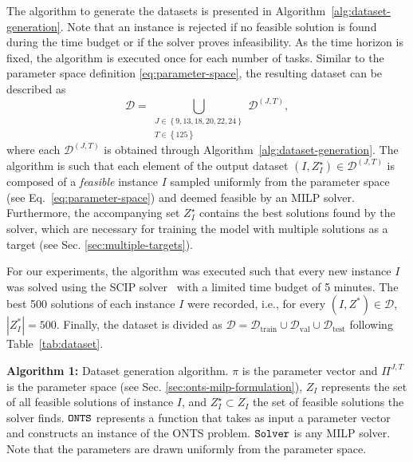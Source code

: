 The algorithm to generate the datasets is presented in Algorithm~\ref{alg:dataset-generation}.
Note that an instance is rejected if no feasible solution is found during the time budget or if the solver proves infeasibility.
As the time horizon is fixed, the algorithm is executed once for each number of tasks.
Similar to the parameter space definition \eqref{eq:parameter-space}, the resulting dataset can be described as
\begin{equation}\label{eq:dataset}
    \mathcal{D} = \bigcup_{\substack{J \in \left\{ 9,13,18,20,22,24 \right\} \\ T \in \left\{ 125 \right\} }}  \mathcal{D}^{(J,T)}
,\end{equation}
where each $\mathcal{D}^{(J,T)}$ is obtained through Algorithm~\ref{alg:dataset-generation}.
The algorithm is such that each element of the output dataset $(I,Z^\star_I) \in \mathcal{D}^{(J,T)}$ is composed of a \emph{feasible} instance $I$ sampled uniformly from the parameter space (see Eq.~\eqref{eq:parameter-space}) and deemed feasible by an MILP solver.
Furthermore, the accompanying set $Z^\star_I$ contains the best solutions found by the solver, which are necessary for training the model with multiple solutions as a target (see Sec. \ref{sec:multiple-targets}).

For our experiments, the algorithm was executed such that every new instance $I$ was solved using the SCIP solver~\cite{bestuzhevaSCIPOptimizationSuite2021} with a limited time budget of 5 minutes.
The best 500 solutions of each instance $I$ were recorded, i.e., for every $(I,Z^{*}) \in \mathcal{D}$, $|Z^{*}_I| = 500$.
Finally, the dataset is divided as $\mathcal{D} = \mathcal{D}_\textrm{train} \cup \mathcal{D}_{\textrm{val}} \cup \mathcal{D}_\textrm{test}$ following Table~\ref{tab:dataset}.

\begin{algorithm}[h]
    \NoCaptionOfAlgo
    \SetAlgoLined
    
    \caption{\textbf{Algorithm 1:} Dataset generation algorithm. $\pi$ is the parameter vector and $\Pi^{J,T}$ is the parameter space (see Sec. \ref{sec:onts-milp-formulation}), $Z_I$ represents the set of all feasible solutions of instance $I$, and $Z_I^\star \subset Z_I$ the set of feasible solutions the solver finds.
    ${\tt ONTS}$ represents a function that takes as input a parameter vector and constructs an instance of the ONTS problem.
    ${\tt Solver}$ is any MILP solver.
    Note that the parameters are drawn uniformly from the parameter space.
    }\label{alg:dataset-generation}
\end{algorithm}

